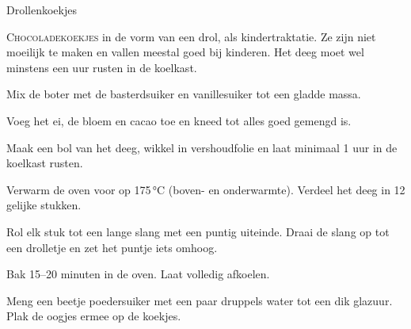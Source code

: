 \begin{recipe}{Drollenkoekjes}


\lettrine{C}{hocoladekoekjes} in de vorm van een drol, als kindertraktatie. Ze
zijn niet moeilijk te maken en vallen meestal goed bij kinderen. Het deeg moet
wel minstens een uur rusten in de koelkast.

\begin{ingredients}
\end{ingredients}

\begin{steps}
  \item Mix de boter met de basterdsuiker en vanillesuiker tot een gladde massa.
  \item Voeg het ei, de bloem en cacao toe en kneed tot alles goed gemengd is.
  \item Maak een bol van het deeg, wikkel in vershoudfolie en laat minimaal 1 uur
        in de koelkast rusten.
  \item Verwarm de oven voor op 175\,°C (boven- en onderwarmte). Verdeel het deeg in 12 gelijke stukken.
  \item Rol elk stuk tot een lange slang met een puntig uiteinde. Draai de slang
        op tot een drolletje en zet het puntje iets omhoog.
  \item Bak 15--20 minuten in de oven. Laat volledig afkoelen.
  \item Meng een beetje poedersuiker met een paar druppels water tot een dik
        glazuur. Plak de oogjes ermee op de koekjes.
\end{steps}
\end{recipe}
